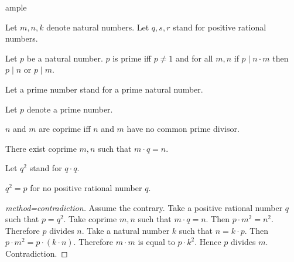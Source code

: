 ample\documentclass[english]{article}
\begin{document}
  \begin{forthel}
    Let $m, n, k$ denote natural numbers.
    Let $q, s, r$ stand for positive rational numbers.

    \begin{definition}
      Let $p$ be a natural number.
      $p$ is prime iff $p\neq 1$ and for all $m, n$
      if $p\mid n\cdot m$ then $p \mid n$ or $p \mid m$.
    \end{definition}

    Let a prime number stand for a prime natural number.

    Let $p$ denote a prime number.

    \begin{definition}
      $n$ and $m$ are coprime iff $n$ and $m$ have no common prime divisor.
    \end{definition}

    \begin{axiom}
      There exist coprime $m,n$ such that $m \cdot q = n$.
    \end{axiom}

    Let $q^{2}$ stand for $q \cdot q$.

    \begin{proposition}
      $q^{2} = p$ for no positive rational number $q$.
    \end{proposition}
    \begin{proof}[method=contradiction]
      Assume the contrary.
      Take a positive rational number $q$ such that $p = q^{2}$.
      Take coprime $m,n$ such that $m \cdot q = n$.
      Then $p \cdot m^{2} = n^{2}$.
      Therefore $p$ divides $n$.
      Take a natural number $k$ such that $n = k \cdot p$.
      Then $p \cdot m^{2} = p \cdot (k \cdot n)$.
      Therefore $m \cdot m$ is equal to $p \cdot k^{2}$.
      Hence $p$ divides $m$.
      Contradiction.
    \end{proof}
  \end{forthel}
\end{document}
